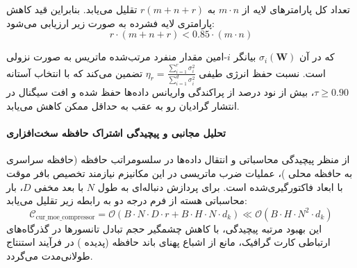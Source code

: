 تعداد کل پارامترهای لایه از $m \cdot n$ به $r(m + n + r)$ تقلیل می‌یابد. بنابراین قید کاهش پارامتری لایه فشرده به صورت زیر ارزیابی می‌شود:
\begin{equation}
r \cdot (m + n + r) < 0.85 \cdot (m \cdot n)
\end{equation}

که در آن $\sigma_i(\mathbf{W})$ بیانگر $i$-امین مقدار منفرد مرتب‌شده ماتریس به صورت نزولی است. نسبت حفظ انرژی طیفی $\eta_r = \frac{\sum_{i=1}^r \sigma_i^2}{\sum_{i=1}^{d} \sigma_i^2}$ تضمین می‌کند که با انتخاب آستانه $\tau \ge 0.90$، بیش از نود درصد از پراکندگی واریانس داده‌ها حفظ شده و افت سیگنال در انتشار گرادیان رو به عقب به حداقل ممکن کاهش می‌یابد.

\paragraph{تحلیل مجانبی و پیچیدگی اشتراک حافظه سخت‌افزاری}
از منظر پیچیدگی محاسباتی و انتقال داده‌ها در سلسومراتب حافظه (حافظه سراسری  به حافظه محلی )، عملیات ضرب ماتریسی در این مکانیزم نیازمند تخصیص بافر موقت با ابعاد فاکتورگیری‌شده است. برای پردازش دنباله‌ای به طول $N$ با بعد مخفی $D$، بار محاسباتی هسته از فرم درجه دو به رابطه زیر تقلیل می‌یابد:
\begin{equation}
\label{eq:complexity_cur_moe_compressor}
\mathcal{C}_{\text{cur\_moe\_compressor}} = \mathcal{O}\left( B \cdot N \cdot D \cdot r + B \cdot H \cdot N \cdot d_k \right) \ll \mathcal{O}\left( B \cdot H \cdot N^2 \cdot d_k \right)
\end{equation}
این بهبود مرتبه پیچیدگی، با کاهش چشمگیر حجم تبادل تانسورها در گذرگاه‌های ارتباطی کارت گرافیک، مانع از اشباع پهنای باند حافظه (پدیده ) در فرآیند استنتاج طولانی‌مدت می‌گردد.
